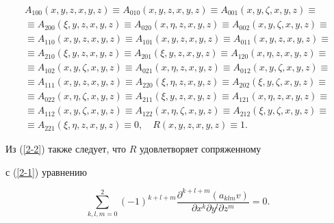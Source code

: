 \begin{gather*}


A_{100}(x,y,z,x,y,z)\equiv A_{010}(x,y,z,x,y,z)\equiv


A_{001}(x,y,\zeta,x,y,z)\equiv \\


\equiv A_{200}(\xi,y,z,x,y,z)\equiv A_{020}(x,\eta,z,x,y,z)


\equiv A_{002}(x,y,\zeta,x,y,z)\equiv  \\


\equiv A_{110}(x,y,z,x,y,z)\equiv


A_{101}(x,y,z,x,y,z)\equiv A_{011}(x,y,z,x,y,z)\equiv \\


\equiv A_{210}(\xi,y,z,x,y,z)\equiv A_{201}(\xi,y,z,x,y,z)\equiv


A_{120}(x,\eta,z,x,y,z)\equiv \\


\equiv A_{102}(x,y,\zeta,x,y,z)\equiv A_{021}(x,\eta,z,x,y,z)\equiv


A_{012}(x,y,\zeta,x,y,z)\equiv \\


\equiv A_{111}(x,y,z,x,y,z)\equiv A_{220}(\xi,\eta,z,x,y,z)\equiv


A_{202}(\xi,y,\zeta,x,y,z)\equiv \\


\equiv A_{022}(x,\eta,\zeta,x,y,z)\equiv A_{211}(\xi,y,z,x,y,z)


\equiv A_{121}(x,\eta,z,x,y,z)\equiv \\


\equiv A_{112}(x,y,\zeta,x,y,z)\equiv A_{122}(x,\eta,\zeta,x,y,z)


\equiv A_{212}(\xi,y,\zeta,x,y,z) \equiv \\


\equiv A_{221}(\xi,\eta,z,x,y,z) \equiv 0,\quad


R(x,y,z,x,y,z)\equiv 1.


\end{gather*}


Из (\ref{2-2}) также следует, что $R$ удовлетворяет сопряженному


с (\ref{2-1}) уравнению


$$


\sum_{k,l,m=0}^{2} (-1)^{k+l+m}


\frac{\partial^{k+l+m}(a_{klm}v)}{


\partial x^{k} \partial y^{l} \partial z^{m}}=0.


$$





